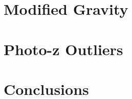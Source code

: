 \documentclass[fleqn,usenatbib,useAMS]{mnras}
\begin{document}
\section{Modified Gravity}
\label{sec:mg}

\section{Photo-z Outliers}
\label{sec:mg}
\section{Conclusions}
\label{sec:conc}
\end{document}
